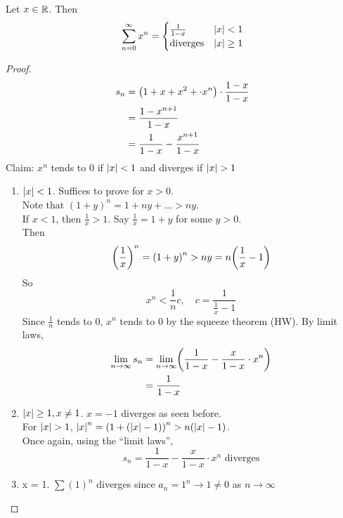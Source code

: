 
\begin{example}
    Let $x \in \mathbb{R}$. Then \[
        \sum_{n=0}^{\infty} x^{n} = \begin{cases}
            \frac{1}{1-x} & \abs{ x} < 1 \\
            \text{diverges} & \abs{ x} \geq 1
        \end{cases}
    \]
\end{example}
\begin{proof}
    \begin{align*}
        s_{n} &= \paren{1 + x + x^{2} + \cdot x^{n} } \cdot \frac{1-x}{1-x} \\
        &= \frac{1-x^{n+1}}{1-x} \\
        &= \frac{1}{1-x} - \frac{x^{n+1}}{1-x}
    \end{align*}
    Claim: $x^{n}$ tends to 0 if $\abs{ x} < 1$ and diverges if $\abs{ x}  > 1$
    \begin{enumerate}[label=(Case \arabic*)]
        \item $\abs{ x} < 1$. Suffices to prove for $x > 0$. \\
        Note that $(1 + y)^{n} = 1 + ny + \dots > ny$. \\
        If $x < 1$, then $\frac{1}{x} > 1$. Say $\frac{1}{x} = 1 + y$ for some $y > 0$. \\
        Then \[
            \paren{\frac{1}{x}}^{n} = \paren{1 + y}^{n} > ny = n\paren{\frac{1}{x} - 1}
        \] So \[
            x^{n} < \frac{1}{n} c, \quad c = \frac{1}{\frac{1}{x} - 1}
        \] Since $\frac{1}{n}$ tends to $0$, $x^{n}$ tends to $0$ by the squeeze theorem (HW). By limit laws,
        \begin{align*}
            \lim_{n \to \infty} s_{n} &= \lim_{n \to \infty} \paren{\frac{1}{1-x} - \frac{x}{1-x}\cdot x^{n}} \\
            &= \frac{1}{1-x}
        \end{align*}
        
        \item $\abs{ x} \geq 1, x \neq 1$. $x = -1$ diverges as seen before. \\
        For $\abs{ x} > 1$, $\abs{ x} ^{n} = \paren{1 + (\abs{ x} - 1)}^{n} > n(\abs{ x} - 1)$. \\
        Once again, using the ``limit laws'', \[
            s_{n} = \frac{1}{1-x} - \frac{x}{1-x} \cdot x^{n} \text{ diverges}
        \]

        \item x = 1. $\sum (1)^{n}$ diverges since $a_{n} = 1^{n} \to 1 \neq 0$ as $n \to \infty$ \qedhere
    \end{enumerate}
\end{proof}

